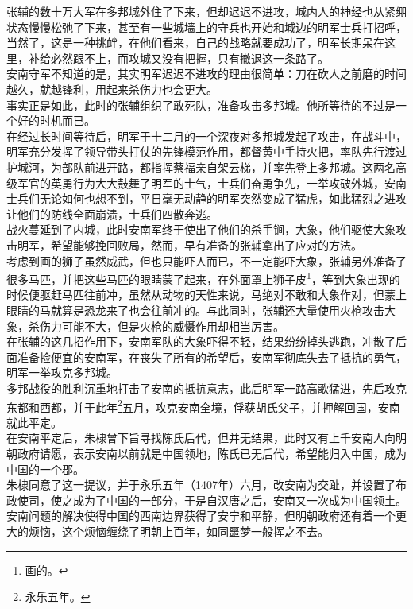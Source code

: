 \begin{multicols}{\theparacolNo}
张辅的数十万大军在多邦城外住了下来，但却迟迟不进攻，城内人的神经也从紧绷状态慢慢松弛了下来，甚至有一些城墙上的守兵也开始和城边的明军士兵打招呼，当然了，这是一种挑衅，在他们看来，自己的战略就要成功了，明军长期呆在这里，补给必然跟不上，而攻城又没有把握，只有撤退这一条路了。\\

安南守军不知道的是，其实明军迟迟不进攻的理由很简单：刀在砍人之前磨的时间越久，就越锋利，用起来杀伤力也会更大。\\

事实正是如此，此时的张辅组织了敢死队，准备攻击多邦城。他所等待的不过是一个好的时机而已。\\

在经过长时间等待后，明军于十二月的一个深夜对多邦城发起了攻击，在战斗中，明军充分发挥了领导带头打仗的先锋模范作用，都督黄中手持火把，率队先行渡过护城河，为部队前进开路，都指挥蔡福亲自架云梯，并率先登上多邦城。这两名高级军官的英勇行为大大鼓舞了明军的士气，士兵们奋勇争先，一举攻破外城，安南士兵们无论如何也想不到，平日毫无动静的明军突然变成了猛虎，如此猛烈之进攻让他们的防线全面崩溃，士兵们四散奔逃。\\

战火蔓延到了内城，此时安南军终于使出了他们的杀手锏，大象，他们驱使大象攻击明军，希望能够挽回败局，然而，早有准备的张辅拿出了应对的方法。\\

考虑到画的狮子虽然威武，但也只能吓人而已，不一定能吓大象，张辅另外准备了很多马匹，并把这些马匹的眼睛蒙了起来，在外面罩上狮子皮\footnote{画的。}，等到大象出现的时候便驱赶马匹往前冲，虽然从动物的天性来说，马绝对不敢和大象作对，但蒙上眼睛的马就算是恐龙来了也会往前冲的。与此同时，张辅还大量使用火枪攻击大象，杀伤力可能不大，但是火枪的威慑作用却相当厉害。\\

在张辅的这几招作用下，安南军队的大象吓得不轻，结果纷纷掉头逃跑，冲散了后面准备捡便宜的安南军，在丧失了所有的希望后，安南军彻底失去了抵抗的勇气，明军一举攻克多邦城。\\

多邦战役的胜利沉重地打击了安南的抵抗意志，此后明军一路高歌猛进，先后攻克东都和西都，并于此年\footnote{永乐五年。}五月，攻克安南全境，俘获胡氏父子，并押解回国，安南就此平定。\\

在安南平定后，朱棣曾下旨寻找陈氏后代，但并无结果，此时又有上千安南人向明朝政府请愿，表示安南以前就是中国领地，陈氏已无后代，希望能归入中国，成为中国的一个郡。\\

朱棣同意了这一提议，并于永乐五年（1407年）六月，改安南为交趾，并设置了布政使司，使之成为了中国的一部分，于是自汉唐之后，安南又一次成为中国领土。\\

安南问题的解决使得中国的西南边界获得了安宁和平静，但明朝政府还有着一个更大的烦恼，这个烦恼缠绕了明朝上百年，如同噩梦一般挥之不去。\\
\ifnum{}
	\end{multicols}
\fi
\newpage
